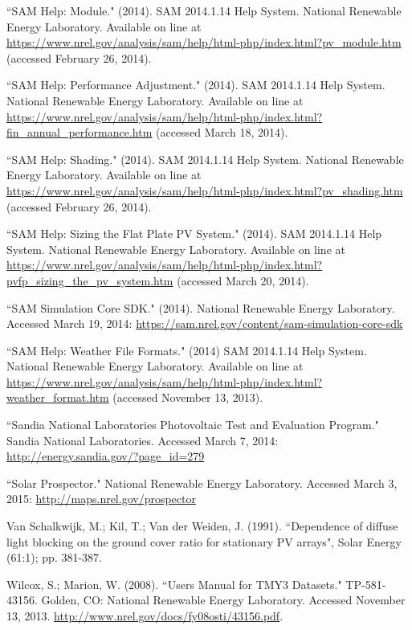 \documentclass[12pt,letterpaper]{article}
\begin{document}
\begin{thebibliography}{99}
 ``SAM Help: Module." (2014). SAM 2014.1.14 Help System. National Renewable Energy Laboratory. Available on line at \url{https://www.nrel.gov/analysis/sam/help/html-php/index.html?pv_module.htm} (accessed February 26, 2014).

 ``SAM Help: Performance Adjustment." (2014). SAM 2014.1.14 Help System. National Renewable Energy Laboratory. Available on line at \url{https://www.nrel.gov/analysis/sam/help/html-php/index.html?fin_annual_performance.htm} (accessed March 18, 2014).

 ``SAM Help: Shading." (2014). SAM 2014.1.14 Help System. National Renewable Energy Laboratory. Available on line at \url{https://www.nrel.gov/analysis/sam/help/html-php/index.html?pv_shading.htm} (accessed February 26, 2014).

 ``SAM Help: Sizing the Flat Plate PV System." (2014). SAM 2014.1.14 Help System. National Renewable Energy Laboratory. Available on line at \url{https://www.nrel.gov/analysis/sam/help/html-php/index.html?pvfp\_sizing\_the\_pv\_system.htm} (accessed March 20, 2014).

 ``SAM Simulation Core SDK." (2014). National Renewable Energy Laboratory. Accessed March 19, 2014: \url{https://sam.nrel.gov/content/sam-simulation-core-sdk}

 ``SAM Help: Weather File Formats." (2014) SAM 2014.1.14 Help System. National Renewable Energy Laboratory. Available on line at  \url{https://www.nrel.gov/analysis/sam/help/html-php/index.html?weather_format.htm} (accessed November 13, 2013).

 ``Sandia National Laboratories Photovoltaic Test and Evaluation Program." Sandia National Laboratories. Accessed March 7, 2014: \url{http://energy.sandia.gov/?page_id=279}

``Solar Prospector." National Renewable Energy Laboratory. Accessed March 3, 2015: \url{http://maps.nrel.gov/prospector}

 Van Schalkwijk, M.; Kil, T.; Van der Weiden, J. (1991). ``Dependence of diffuse light blocking on the ground cover ratio for stationary PV arrays", Solar Energy (61:1); pp. 381-387.

 Wilcox, S.; Marion, W. (2008). ``Users Manual for TMY3 Datasets." TP-581-43156. Golden, CO: National Renewable Energy Laboratory. Accessed November 13, 2013. \url{http://www.nrel.gov/docs/fy08osti/43156.pdf}.

\end{thebibliography}
\end{document}
